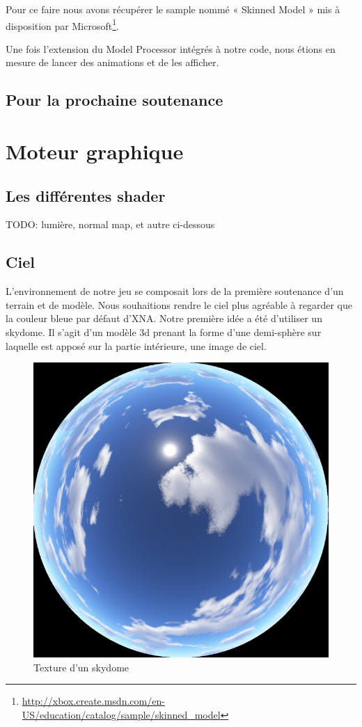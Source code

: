 \documentclass[11pt]{report}
\begin{document}
Pour ce faire nous avons récupérer le sample nommé « Skinned Model » mis à disposition par Microsoft\footnote{\url{http://xbox.create.msdn.com/en-US/education/catalog/sample/skinned_model}}.

Une fois l’extension du Model Processor intégrés à notre code, nous étions en mesure de lancer des animations et de les afficher.

\subsection{Pour la prochaine soutenance}


\newpage
\section{Moteur graphique}

\subsection{Les différentes shader}

TODO: lumière, normal map, et autre ci-dessous

\subsection{Ciel}

L’environnement de notre jeu se composait lors de la première soutenance d’un terrain et de modèle. Nous souhaitions rendre le ciel plus agréable à regarder que la couleur bleue par défaut d’XNA. Notre première idée a été d’utiliser un skydome. Il s’agit d’un modèle 3d prenant la forme d’une demi-sphère sur laquelle est apposé sur la partie intérieure, une image de ciel.

\begin{figure}[htbp]
\centering
\includegraphics[scale=0.8]{skydome_texture.png}
\caption{Texture d'un skydome}
\end{figure}
\end{document}
